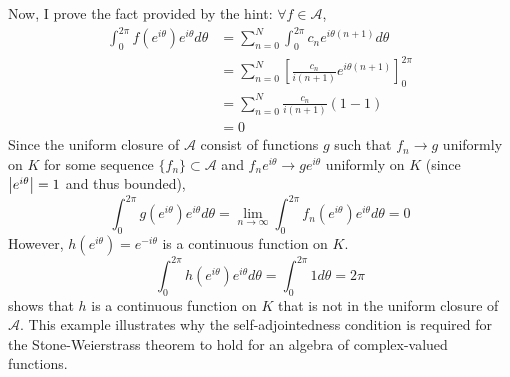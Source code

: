 \documentclass[12pt]{article}
\begin{document}
Now, I prove the fact provided by the hint: $\forall f \in \mathscr{A}$,
\begin{align*}
  \int_{0}^{2\pi} f(e^{i\theta}) e^{i\theta} d\theta & = \sum_{n = 0}^{N} \int_{0}^{2\pi} c_n e^{i\theta(n + 1)} d\theta \\ 
                                                     & = \sum_{n = 0}^{N} \left[ \frac{c_n}{i(n + 1)} e^{i\theta(n + 1)}\right]_{0}^{2\pi} \\ 
                                                     & = \sum_{n = 0}^{N} \frac{c_n}{i(n + 1)}(1 - 1) \\ 
                                                     & = 0
\end{align*} 
Since the uniform closure of $\mathscr{A}$ consist of functions $g$ such that $f_n \rightarrow g$ uniformly on $K$ for some sequence $\{f_n\} \subset \mathscr{A}$ and $f_n e^{i\theta} \rightarrow g e^{i\theta}$ uniformly on $K$ (since $\left|e^{i\theta}\right| = 1$ and thus bounded),   
$$\int_{0}^{2\pi} g(e^{i\theta}) e^{i\theta} d\theta = \lim_{n \rightarrow \infty} \int_{0}^{2\pi} f_n(e^{i\theta}) e^{i \theta} d\theta = 0$$
However, $h(e^{i\theta}) = e^{-i\theta}$ is a continuous function on $K$.
$$\int_{0}^{2\pi} h(e^{i\theta}) e^{i\theta} d\theta = \int_{0}^{2\pi} 1 d\theta = 2\pi$$
shows that $h$ is a continuous function on $K$ that is not in the uniform closure of $\mathscr{A}$. 
This example illustrates why the self-adjointedness condition is required for the Stone-Weierstrass theorem to hold for an algebra of complex-valued functions. 
\end{document}
